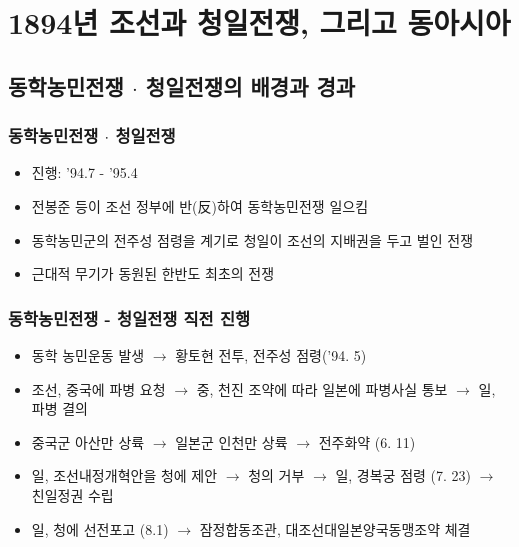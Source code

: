 \section{1894년 조선과 청일전쟁, 그리고 동아시아}

\subsection{동학농민전쟁 $\cdot$ 청일전쟁의 배경과 경과}

\subsubsection*{동학농민전쟁 $\cdot$ 청일전쟁}
\begin{itemize}
    \item 진행: '94.7 - '95.4
    \item 전봉준 등이 조선 정부에 반(反)하여 동학농민전쟁 일으킴
    \item 동학농민군의 전주성 점령을 계기로 청일이 조선의 지배권을 두고 벌인 전쟁
    \item 근대적 무기가 동원된 한반도 최초의 전쟁
\end{itemize}

\subsubsection*{동학농민전쟁 - 청일전쟁 직전 진행}
\begin{itemize}
    \item 동학 농민운동 발생 $\rightarrow$ 황토현 전투, 전주성 점령('94. 5)
    \item 조선, 중국에 파병 요청 $\rightarrow$ 중, 천진 조약에 따라 일본에 파병사실 통보 $\rightarrow$ 일, 파병 결의
    \item 중국군 아산만 상륙 $\rightarrow$ 일본군 인천만 상륙 $\rightarrow$ 전주화약 (6. 11)
    \item 일, 조선내정개혁안을 청에 제안 $\rightarrow$ 청의 거부 $\rightarrow$ 일, 경복궁 점령 (7. 23) $\rightarrow$ 친일정권 수립
    \item 일, 청에 선전포고 (8.1) $\rightarrow$ 잠정합동조관, 대조선대일본양국동맹조약 체결
\end{itemize}

